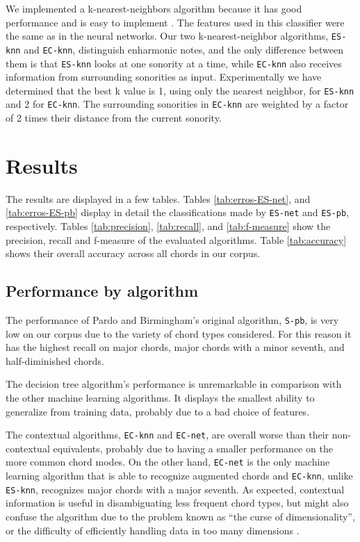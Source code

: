 We implemented a k-nearest-neighbors algorithm because it has good
performance and is easy to implement
\cite{fix.ea89:important,gomez.ea04:estimating}. The features used in
this classifier were the same as in the neural networks. Our two
k-nearest-neighbor algorithms, \texttt{ES-knn} and \texttt{EC-knn},
distinguish enharmonic notes, and the only difference between them is
that \texttt{ES-knn} looks at one sonority at a time, while
\texttt{EC-knn} also receives information from surrounding sonorities
as input. Experimentally we have determined that the best k value is
1, using only the nearest neighbor, for \texttt{ES-knn} and 2 for
\texttt{EC-knn}. The surrounding sonorities in \texttt{EC-knn} are
weighted by a factor of 2 times their distance from the current
sonority.

\section{Results}
\label{sec:discussion}

The results are displayed in a few tables. Tables
\ref{tab:erros-ES-net}, and \ref{tab:erros-ES-pb} display in detail
the classifications made by \texttt{ES-net} and \texttt{ES-pb},
respectively. Tables \ref{tab:precision}, \ref{tab:recall}, and
\ref{tab:f-measure} show the precision, recall and f-measure of the
evaluated algorithms. Table \ref{tab:accuracy} shows their overall
accuracy across all chords in our corpus.

\subsection{Performance by algorithm}
\label{sec:algo-perf}

The performance of Pardo and Birmingham's original algorithm,
\texttt{S-pb}, is very low on our corpus due to the variety of chord
types considered. For this reason it has the highest recall on major
chords, major chords with a minor seventh, and half-diminished chords.

The decision tree algorithm's performance is unremarkable in
comparison with the other machine learning algorithms. It displays the
smallest ability to generalize from training data, probably due to a
bad choice of features.

The contextual algorithms, \texttt{EC-knn} and \texttt{EC-net}, are
overall worse than their non-contextual equivalents, probably due to
having a smaller performance on the more common chord modes. On the
other hand, \texttt{EC-net} is the only machine learning algorithm
that is able to recognize augmented chords and \texttt{EC-knn}, unlike
\texttt{ES-knn}, recognizes major chords with a major seventh. As
expected, contextual information is useful in disambiguating less
frequent chord types, but might also confuse the algorithm due to the
problem known as ``the curse of dimensionality'', or the difficulty of
efficiently handling data in too many dimensions
\cite{duda.ea00:pattern}.


